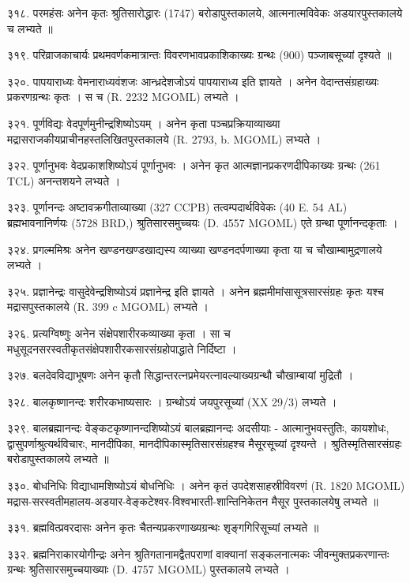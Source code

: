 ३१८. परमहंसः
अनेन कृतः श्रुतिसारोद्धारः (1747) बरोडापुस्तकालये, आत्मनात्मविवेकः अडयारपुस्तकालये च लभ्यते ॥

३१९. परिव्राजकाचार्यः 
प्रथमवर्णकमात्रान्तः विवरणभावप्रकाशिकाख्यः ग्रन्थः (900) पञ्जाबसूच्यां दृश्यते ॥

३२०. पापयाराध्यः
वेमनाराध्यवंशजः आन्ध्रदेशजोऽयं पापयाराध्य इति ज्ञायते । अनेन वेदान्तसंग्रहाख्यः प्रकरणग्रन्थः कृतः । स च (R. 2232 MGOML) लभ्यते ।

३२१. पूर्णविद्यः
वेदपूर्णमुनीन्द्रशिष्योऽयम् । अनेन कृता पञ्चप्रक्रियाव्याख्या मद्रासराजकीयप्राचीनहस्तलिखितपुस्तकालये (R. 2793, b. MGOML) लभ्यते ।

३२२. पूर्णानुभवः
वेदप्रकाशशिष्योऽयं पूर्णानुभवः । अनेन कृत आत्मज्ञानप्रकरणदीपिकाख्यः ग्रन्थः (261 TCL) अनन्तशयने लभ्यते ।

३२३. पूर्णानन्दः
अष्टावक्रगीताव्याख्या (327 CCPB) तत्वम्पदार्थविवेकः (40 E. 54 AL) ब्रह्मभावनानिर्णयः (5728 BRD,) श्रुतिसारसमुच्चयः (D. 4557 MGOML) एते ग्रन्था पूर्णानन्दकृताः ।

३२४. प्रगल्ममिश्रः
अनेन खण्डनखण्डखाद्यस्य व्याख्या खण्डनदर्पणाख्या कृता या च चौखाम्बामुद्रणालये लभ्यते ।

३२५. प्रज्ञानेन्द्रः
वासुदेवेन्द्रशिष्योऽयं प्रज्ञानेन्द्र इति ज्ञायते । अनेन ब्रह्ममीमांसासूत्रसारसंग्रहः कृतः यश्च मद्रासपुस्तकालये (R. 399 c MGOML) लभ्यते ।

३२६. प्रत्यग्विष्णुः
अनेन संक्षेपशारीरकव्याख्या कृता । सा च मधुसूदनसरस्वतीकृतसंक्षेपशारीरकसारसंग्रहोपाद्धाते निर्दिष्टा ।

३२७. बलदेवविद्याभूषणः 
अनेन कृतौ सिद्धान्तरत्नप्रमेयरत्नावल्याख्यग्रन्थौ चौखाम्बायां मुद्रितौ ।

३२८. बालकृष्णानन्दः
शरीरकभाष्यसारः । ग्रन्थोऽयं जयपुरसूच्यां (XX 29/3) लभ्यते ।

३२९. बालब्रह्मानन्दः 
वेङ्कटकृष्णानन्दशिष्योऽयं बालब्रह्मानन्दः अदसीयाः - आत्मानुभवस्तुतिः, कायशोधः, द्वासुपर्णाश्रुत्यर्थविचारः, मानदीपिका, मानदीपिकास्मृतिसारसंग्रहश्च मैसूरसूच्यां दृश्यन्ते । श्रुतिस्मृतिसारसंग्रहः बरोडापुस्तकालये लभ्यते ॥

३३०. बोधनिधिः
विद्याधामशिष्योऽयं बोधनिधिः । अनेन कृतं उपदेशसाहस्रीविवरणं (R. 1820 MGOML) मद्रास-सरस्वतीमहालय-अडयार-वेङ्कटेश्वर-विश्वभारती-शान्तिनिकेतन मैसूर पुस्तकालयेषु लभ्यते ॥

३३१. ब्रह्मवित्प्रवरदासः
अनेन कृतः चैतन्यप्रकरणाख्यग्रन्थः शृङ्गगिरिसूच्यां लभ्यते ॥

३३२. ब्रह्मनिराकारयोगीन्द्रः
अनेन श्रुतिगतानामद्वैतपराणां वाक्यानां सङ्कलनात्मकः जीवन्मुक्तप्रकरणान्तः ग्रन्थः श्रुतिसारसमुच्चयाख्याः (D. 4757 MGOML) पुस्तकालये लभ्यते ।

